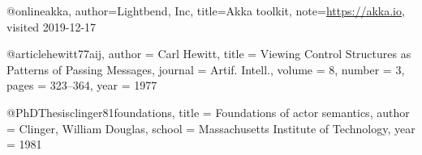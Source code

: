 @online{akka,
  author={{Lightbend, Inc}},
  title={Akka toolkit},
  note={\url{https://akka.io}, visited 2019-12-17}
}

@article{hewitt77aij,
  author    = {Carl Hewitt},
  title     = {Viewing Control Structures as Patterns of Passing Messages},
  journal   = {Artif. Intell.},
  volume    = {8},
  number    = {3},
  pages     = {323--364},
  year      = {1977}
}

@PhDThesis{clinger81foundations,
title = {Foundations of actor semantics},
author = {Clinger, William Douglas},
school = {Massachusetts Institute of Technology},
year = {1981}
}
